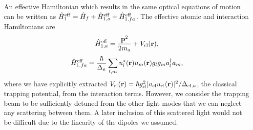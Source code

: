 An effective Hamiltonian which results in the same optical equations
of motion can be written as
$\hat{H}^\mathrm{eff}_1 = \hat{H}_f + \hat{H}^\mathrm{eff}_{1,a} +
\hat{H}^\mathrm{eff}_{1,fa}$. The effective atomic and interaction
Hamiltonians  are
\begin{equation}
\label{eq:aeff}
  \hat{H}^\mathrm{eff}_{1,a} = \frac{\mathbf{p}^2}{2 m_a} + V_\mathrm{cl}(\mathbf{r}),
\end{equation}
\begin{equation}
\label{eq:faeff}
  \hat{H}^\mathrm{eff}_{1,fa} = \frac{\hbar}{\Delta_a} \sum_{l,m}
  u_l^*(\mathbf{r}) u_m(\mathbf{r}) g_l g_m a^\dagger_l a_m,
\end{equation}
where we have explicitly extracted
$V_\mathrm{cl}(\mathbf{r}) = \hbar g_\mathrm{cl}^2 |a_\mathrm{cl}
u_\mathrm{cl}(\mathbf{r})|^2 / \Delta_{\mathrm{cl},a}$, the classical
trapping potential, from the interaction terms. However, we consider
the trapping beam to be sufficiently detuned from the other light
modes that we can neglect any scattering between them. A later
inclusion of this scattered light would not be difficult due to the
linearity of the dipoles we assumed.


